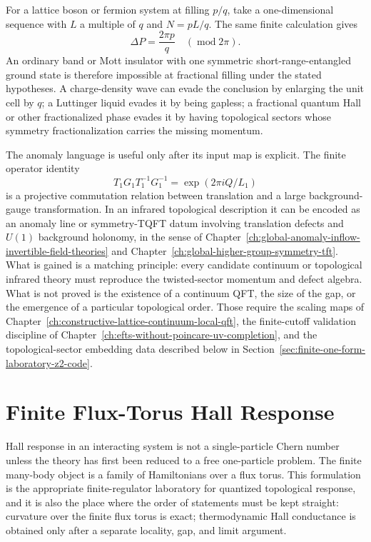 For a lattice boson or fermion system at filling \(p/q\), take a one-dimensional
sequence with \(L\) a multiple of \(q\) and \(N=pL/q\).  The same finite
calculation gives
\[
  \Delta P=\frac{2\pi p}{q}\quad(\operatorname{mod}2\pi).
\]
An ordinary band or Mott insulator with one symmetric short-range-entangled
ground state is therefore impossible at fractional filling under the stated
hypotheses.  A charge-density wave can evade the conclusion by enlarging the
unit cell by \(q\); a Luttinger liquid evades it by being gapless; a fractional
quantum Hall or other fractionalized phase evades it by having topological
sectors whose symmetry fractionalization carries the missing momentum.

The anomaly language is useful only after its input map is explicit.  The
finite operator identity
\[
  T_1G_1T_1^{-1}G_1^{-1}
  =
  \exp(2\pi i Q/L_1)
\]
is a projective commutation relation between translation and a large
background-gauge transformation.  In an infrared topological description it can
be encoded as an anomaly line or symmetry-TQFT datum involving translation
defects and \(U(1)\) background holonomy, in the sense of
Chapter~\ref{ch:global-anomaly-inflow-invertible-field-theories} and
Chapter~\ref{ch:global-higher-group-symmetry-tft}.  What is gained is a
matching principle: every candidate continuum or topological infrared theory
must reproduce the twisted-sector momentum and defect algebra.  What is not
proved is the existence of a continuum QFT, the size of the gap, or the
emergence of a particular topological order.  Those require the scaling maps of
Chapter~\ref{ch:constructive-lattice-continuum-local-qft}, the finite-cutoff
validation discipline of
Chapter~\ref{ch:efts-without-poincare-uv-completion}, and the topological-sector
embedding data described below in
Section~\ref{sec:finite-one-form-laboratory-z2-code}.

\section{Finite Flux-Torus Hall Response}
\label{sec:finite-flux-torus-hall-response}

Hall response in an interacting system is not a single-particle Chern number
unless the theory has first been reduced to a free one-particle problem.  The
finite many-body object is a family of Hamiltonians over a flux torus.  This
formulation is the appropriate finite-regulator laboratory for quantized
topological response, and it is also the place where the order of statements
must be kept straight: curvature over the finite flux torus is exact;
thermodynamic Hall conductance is obtained only after a separate locality,
gap, and limit argument.

